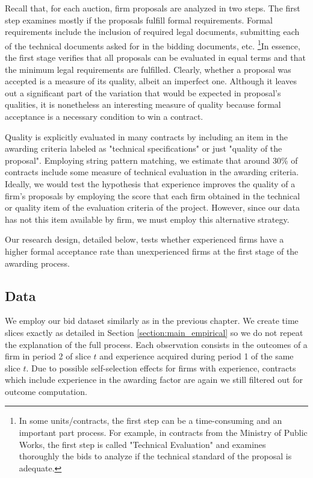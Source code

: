 Recall that, for each auction, firm proposals are analyzed in two steps. The first step examines mostly if the proposals fulfill formal requirements. Formal requirements include the inclusion of required legal documents, submitting each of the technical documents asked for in the bidding documents, etc. \footnote{In some units/contracts, the first step can be a time-consuming and an important part process. For example, in contracts from the Ministry of Public Works, the first step is called "Technical Evaluation" and examines thoroughly the bids to analyze if the technical standard of the proposal is adequate.}In essence, the first stage verifies that all proposals can be evaluated in equal terms and that the minimum legal requirements are fulfilled. Clearly, whether a proposal was accepted is a measure of its quality, albeit an imperfect one. Although it leaves out a significant part of the variation that would be expected in proposal's qualities, it is nonetheless an interesting measure of quality because formal acceptance is a necessary condition to win a contract.

Quality is explicitly evaluated in many contracts by including an item in the awarding criteria labeled as "technical specifications" or just "quality of the proposal". Employing string pattern matching, we estimate that around 30\% of contracts include some measure of technical evaluation in the awarding criteria.  Ideally, we would test the hypothesis that experience improves the quality of a firm's proposals by employing the score that each firm obtained in the technical or quality item of the evaluation criteria of the project. However, since our data has not this item available by firm, we must employ this alternative strategy.

Our research design, detailed below, tests whether experienced firms have a higher formal acceptance rate than unexperienced firms at the first stage of the awarding process.

\subsection{Data}
We employ our bid dataset similarly as in the previous chapter. We create time slices exactly as detailed in Section \ref{section:main_empirical} so we do not repeat the explanation of the full process.  Each observation consists in the outcomes of a firm in period 2 of slice $t$ and experience acquired during period 1 of the same slice $t$. Due to possible self-selection effects for firms with experience, contracts which include experience in the awarding factor are again we still filtered out for outcome computation.

